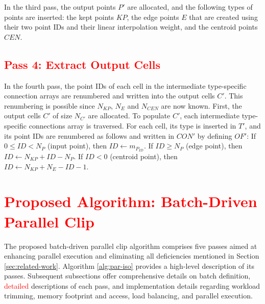 \documentclass{egpubl}
\newcommand*{\fix}[1]{\textcolor{red}{#1}}
\begin{document}
In the third pass, the output points $P'$ are allocated, and the following types of points are inserted: the kept points $KP$, the edge points $E$ that are created using their two point IDs and their linear interpolation weight, and the centroid points $CEN$.

\subsection{\fix{Pass 4: Extract Output Cells}}

In the fourth pass, the point IDs of each cell in the intermediate type-specific connection arrays are renumbered and written into the output cells $C'$. This renumbering is possible since $N_{KP}$, $N_E$ and $N_{CEN}$ are now known. First, the output cells $C'$ of size $N_{C'}$ are allocated. To populate $C'$, each intermediate type-specific connections array is traversed. For each cell, its type is inserted in $T'$, and its point IDs are renumbered as follows and written in $CON'$ by defining $OF'$:
If $0 \leq ID < N_P$ (input point), then $ID \gets m_{P_{ID}}$.
If $ID \geq N_P$ (edge point), then $ID \gets N_{KP} + ID - N_P$.
If $\textit{ID} < 0 $ (centroid point), then $ID \gets N_{KP} + N_E - ID - 1$.

\section{\fix{Proposed Algorithm: Batch-Driven Parallel Clip}}
\label{sec:batch-driven-parallel-clip-algorithm}

The proposed batch-driven parallel clip algorithm comprises five passes aimed at enhancing parallel execution and eliminating all deficiencies mentioned in Section \ref{sec:related-work}. Algorithm \ref{alg:par-iso} provides a high-level description of its passes. Subsequent subsections offer comprehensive details on batch definition, \fix{detailed} descriptions of each pass, and implementation details regarding workload trimming, memory footprint and access, load balancing, and parallel execution.
\end{document}
